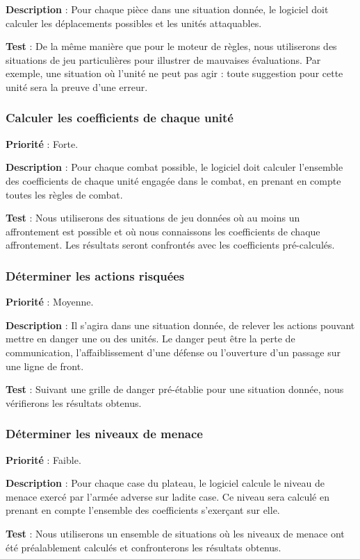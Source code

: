 			\textbf{Description} : Pour chaque pièce dans une situation donnée, le logiciel doit calculer les déplacements possibles et les unités attaquables.
			
			\textbf{Test} : De la même manière que pour le moteur de règles, nous utiliserons des situations de jeu particulières pour illustrer de mauvaises évaluations. Par exemple, une situation où l'unité ne peut pas agir : toute suggestion pour cette unité sera la preuve d'une erreur.
			\subsubsection{Calculer les coefficients de chaque unité}
			\textbf{Priorité} : Forte.
			
			\textbf{Description} : Pour chaque combat possible, le logiciel doit calculer l'ensemble des coefficients de chaque unité engagée dans le combat, en prenant en compte toutes les règles de combat.
			
			\textbf{Test} : Nous utiliserons des situations de jeu données où au moins un affrontement est possible et où nous connaissons les coefficients de chaque affrontement. Les résultats seront confrontés avec les coefficients pré-calculés.
			\subsubsection{Déterminer les actions risquées}
			\textbf{Priorité} : Moyenne.
			
			\textbf{Description} : Il s'agira dans une situation donnée, de relever les actions pouvant mettre en danger une ou des unités. Le danger peut être la perte de communication, l'affaiblissement d'une défense ou l'ouverture d'un passage sur une ligne de front.
			
			\textbf{Test} : Suivant une grille de danger pré-établie pour une situation donnée, nous vérifierons les résultats obtenus.
			\subsubsection{Déterminer les niveaux de menace}
			\textbf{Priorité} : Faible.
			
			\textbf{Description} : Pour chaque case du plateau, le logiciel calcule le niveau de menace exercé par l'armée adverse sur ladite case. Ce niveau sera calculé en prenant en compte l'ensemble des coefficients s'exerçant sur elle.
			
			\textbf{Test} : Nous utiliserons un ensemble de situations où les niveaux de menace ont été préalablement calculés et confronterons les résultats obtenus.
			
